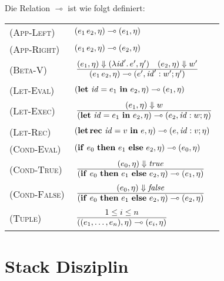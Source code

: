 \documentclass[12pt,fleqn,a4paper]{article}
\newcommand{\RN}[1]{\mbox{\textsc{(#1)}}}
\newcommand{\cl}{\name{cl}}
\begin{document}

\begin{definition}
  Die Relation $\multimap$ ist wie folgt definiert: \\[5mm]
  \begin{tabular}{ll}
    \RN{App-Left}   & $(e_1\,e_2,\eta) \multimap (e_1,\eta)$ \\[1mm]
    \RN{App-Right}  & $(e_1\,e_2,\eta) \multimap (e_2,\eta)$ \\[1mm]
    \RN{Beta-V}     & $\regel{(e_1,\eta) \Downarrow (\abstr{\id'}{e'},\eta')
                              \quad (e_2,\eta) \Downarrow w'}
                             {(\app{e_1}{e_2},\eta) \multimap (e',\id':w';\eta')}$ \\[3mm]
    \RN{Let-Eval}   & $(\mathbf{let}\ {\text{\it id\/}} = e_1\ \mathbf{in}\ e_2,\eta) \multimap (e_1,\eta)$ \\[1mm]
    \RN{Let-Exec}   & $\regel{(e_1,\eta) \Downarrow w}
                             {(\bli{\id}{e_1}{e_2},\eta) \multimap (e_2,\id:w;\eta)}$ \\[3mm]
    \RN{Let-Rec}    & $(\mathbf{let}\,\mathbf{rec}\ {\text{\it id\/}} = v\ \mathbf{in}\ e,\eta) \multimap (e,{\text{\it id\/}}:v;\eta)$ \\[1mm]
    \RN{Cond-Eval}  & $(\mathbf{if}\ e_0\ \mathbf{then}\ e_1\ \mathbf{else}\ e_2,\eta) \multimap (e_0,\eta)$ \\[1mm]
    \RN{Cond-True}  & $\regel{(e_0,\eta) \Downarrow \true}
                             {(\bifte{e_0}{e_1}{e_2},\eta) \multimap (e_1,\eta)}$ \\[3mm]
    \RN{Cond-False} & $\regel{(e_0,\eta) \Downarrow \false}
                             {(\bifte{e_0}{e_1}{e_2},\eta) \multimap (e_2,\eta)}$ \\[3mm]
    \RN{Tuple}      & $\regel{1 \le i \le n}
                             {((e_1,\ldots,e_n),\eta) \multimap (e_i,\eta)}$ \\[3mm]
  \end{tabular}
\end{definition}


\section{Stack Disziplin}
\end{document}
